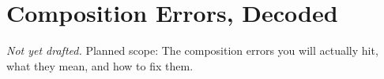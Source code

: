 \chapter{Composition Errors, Decoded}
\label{app:composition-errors}

\emph{Not yet drafted.} Planned scope: The composition errors you will actually hit, what they mean, and how to fix them.
